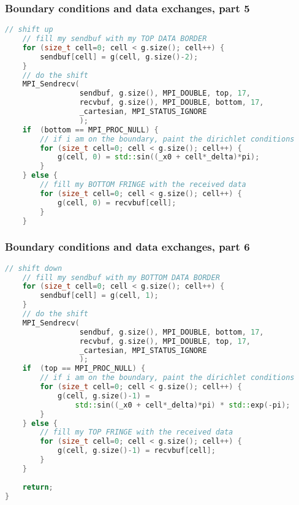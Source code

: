 \begin{frame}[fragile]
%
  \frametitle{Boundary conditions and data exchanges, part 5}
%
  \begin{lstlisting}[language=c++,name=mpi:example-impl]
    // shift up
    // fill my sendbuf with my TOP DATA BORDER
    for (size_t cell=0; cell < g.size(); cell++) {
        sendbuf[cell] = g(cell, g.size()-2);
    }
    // do the shift
    MPI_Sendrecv(
                 sendbuf, g.size(), MPI_DOUBLE, top, 17,
                 recvbuf, g.size(), MPI_DOUBLE, bottom, 17,
                 _cartesian, MPI_STATUS_IGNORE
                 );
    if  (bottom == MPI_PROC_NULL) {
        // if i am on the boundary, paint the dirichlet conditions
        for (size_t cell=0; cell < g.size(); cell++) {
            g(cell, 0) = std::sin((_x0 + cell*_delta)*pi);
        }
    } else {
        // fill my BOTTOM FRINGE with the received data
        for (size_t cell=0; cell < g.size(); cell++) {
            g(cell, 0) = recvbuf[cell];
        }
    }
  \end{lstlisting}
% 
\end{frame}

\begin{frame}[fragile]
%
  \frametitle{Boundary conditions and data exchanges, part 6}
%
  \begin{lstlisting}[language=c++,name=mpi:example-impl]
    // shift down
    // fill my sendbuf with my BOTTOM DATA BORDER
    for (size_t cell=0; cell < g.size(); cell++) {
        sendbuf[cell] = g(cell, 1);
    }
    // do the shift
    MPI_Sendrecv(
                 sendbuf, g.size(), MPI_DOUBLE, bottom, 17,
                 recvbuf, g.size(), MPI_DOUBLE, top, 17,
                 _cartesian, MPI_STATUS_IGNORE
                 );
    if  (top == MPI_PROC_NULL) {
        // if i am on the boundary, paint the dirichlet conditions
        for (size_t cell=0; cell < g.size(); cell++) {
            g(cell, g.size()-1) = 
                std::sin((_x0 + cell*_delta)*pi) * std::exp(-pi);
        }
    } else {
        // fill my TOP FRINGE with the received data
        for (size_t cell=0; cell < g.size(); cell++) {
            g(cell, g.size()-1) = recvbuf[cell];
        }
    }
    
    return;
}
  \end{lstlisting}
% 
\end{frame}

